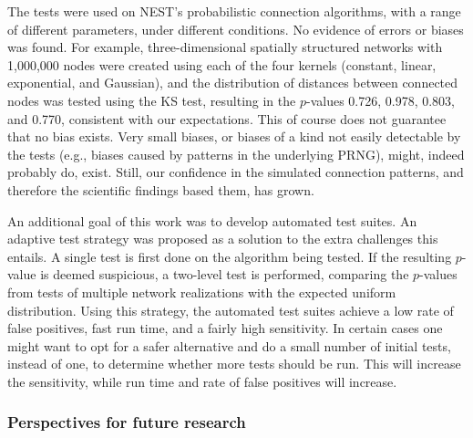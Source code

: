 
The tests were used on NEST's probabilistic connection algorithms, with a range of different parameters, under different conditions. No evidence of errors or biases was found. For example, three-dimensional spatially structured networks with 1,000,000 nodes were created using each of the four kernels (constant, linear, exponential, and Gaussian), and the distribution of distances between connected nodes was tested using the KS test, resulting in the $p$-values 0.726, 0.978, 0.803, and 0.770, consistent with our expectations. This of course does not guarantee that no bias exists. Very small biases, or biases of a kind not easily detectable by the tests (e.g., biases caused by patterns in the underlying PRNG), might, indeed probably do, exist. Still, our confidence in the simulated connection patterns, and therefore the scientific findings based them, has grown.


An additional goal of this work was to develop automated test suites. An adaptive test strategy was proposed as a solution to the extra challenges this entails. A single test is first done on the algorithm being tested. If the resulting $p$-value is deemed suspicious, a two-level test is performed, comparing the $p$-values from tests of multiple network realizations with the expected uniform distribution. Using this strategy, the automated test suites achieve a low rate of false positives, fast run time, and a fairly high sensitivity. In certain cases one might want to opt for a safer alternative and do a small number of initial tests, instead of one, to determine whether more tests should be run. This will increase the sensitivity, while run time and rate of false positives will increase. 



\subsubsection{Perspectives for future research}


